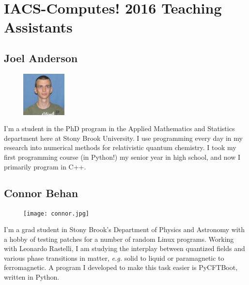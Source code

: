 \documentclass[]{article}
\begin{document}
\section*{IACS-Computes! 2016 Teaching Assistants}

\subsection*{Joel Anderson} 
\begin{figure}
\begin{centering}
    \includegraphics[width=0.2\textwidth]{joel.jpg}
\end{centering}
\end{figure}
I'm a student in the PhD program in the Applied Mathematics and Statistics department here at Stony Brook University. I use programming every day in my research into numerical methods for relativistic quantum chemistry. I took my first programming course (in Python!) my senior year in high school, and now I primarily program in C++.

\subsection*{Connor Behan} 
\begin{figure}
\begin{centering}
    \texttt{[image: connor.jpg]}
\end{centering}
\end{figure}
I'm a grad student in Stony Brook's Department of Physics and Astronomy with a hobby of testing patches for a number of random Linux programs. Working with Leonardo Rastelli, I am studying the interplay between quantized fields and various phase transitions in matter, \textit{e.g.} solid to liquid or paramagnetic to ferromagnetic. A program I developed to make this task easier is PyCFTBoot, written in Python. 
\end{document}
